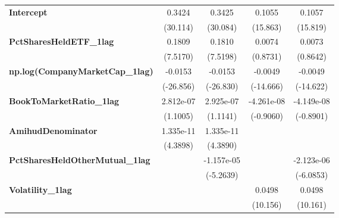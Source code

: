 {\begin{longtable}{>{\bfseries}lcccc}
\textbf{Intercept}                         &        0.3424       &             0.3425             &        0.1055       &              0.1057              \\
\textbf{ }                                 &       (30.114)      &            (30.084)            &       (15.863)      &             (15.819)             \\
\textbf{PctSharesHeldETF\_1lag}            &        0.1809       &             0.1810             &        0.0074       &              0.0073              \\
\textbf{ }                                 &       (7.5170)      &            (7.5198)            &       (0.8731)      &             (0.8642)             \\
\textbf{np.log(CompanyMarketCap\_1lag)}    &       -0.0153       &            -0.0153             &       -0.0049       &             -0.0049              \\
\textbf{ }                                 &      (-26.856)      &           (-26.830)            &      (-14.666)      &            (-14.622)             \\
\textbf{BookToMarketRatio\_1lag}           &      2.812e-07      &           2.925e-07            &      -4.261e-08     &            -4.149e-08            \\
\textbf{ }                                 &       (1.1005)      &            (1.1141)            &      (-0.9060)      &            (-0.8901)             \\
\textbf{AmihudDenominator}                 &      1.335e-11      &           1.335e-11            &                     &                                  \\
\textbf{ }                                 &       (4.3898)      &            (4.3890)            &                     &                                  \\
\textbf{PctSharesHeldOtherMutual\_1lag}    &                     &           -1.157e-05           &                     &            -2.123e-06            \\
\textbf{ }                                 &                     &           (-5.2639)            &                     &            (-6.0853)             \\
\textbf{Volatility\_1lag}                  &                     &                                &        0.0498       &              0.0498              \\
\textbf{ }                                 &                     &                                &       (10.156)      &             (10.161)             \\

\end{longtable}}
